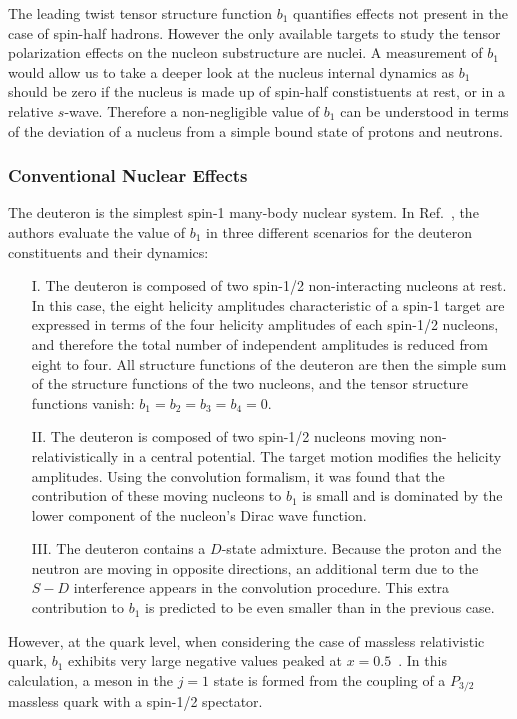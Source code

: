 The leading twist tensor structure function $b_1$ quantifies effects not present in 
the case of spin-half hadrons. However the only available targets to study the 
tensor polarization effects on the nucleon substructure are nuclei. 
A measurement of $b_1$ would allow us to take 
a deeper look at the nucleus internal dynamics as $b_1$ should be zero if the 
nucleus is made up of spin-half constistuents at rest, or in a relative $s$-wave. 
Therefore a non-negligible value of $b_1$ can be understood in terms of the deviation 
of a nucleus from a simple bound state of protons and neutrons.
%
\subsubsection{Conventional Nuclear Effects}
The deuteron is the simplest spin-1 many-body nuclear system. In Ref.~\cite{Hoodbhoy:1988am},
the authors evaluate the value of $b_1$ in three different scenarios for the deuteron
constituents and their dynamics:
\begin{enumerate}
 \item[I.] The deuteron is composed of two spin-1/2 non-interacting nucleons at rest. 
In this case, the eight helicity amplitudes characteristic of a spin-1 target are 
expressed in terms of the four helicity amplitudes of each spin-1/2 nucleons, and 
therefore the total number of independent amplitudes is reduced from eight to four. All structure 
functions of the deuteron are then the simple sum of the structure functions of the two 
nucleons, and the tensor structure functions vanish: $b_1 = b_2 
= b_3 = b_4 = 0$. 
 \item[II.] The deuteron is composed of two spin-1/2 nucleons moving non-relativistically 
in a central potential. The target motion modifies the helicity amplitudes. Using
the convolution formalism, it was found that the contribution of these moving nucleons
to $b_1$ is small and is dominated by the lower component of the nucleon's Dirac
wave function.
 \item[III.] The deuteron contains a $D$-state admixture. Because the proton and the neutron
are moving in opposite directions, an additional term due to the $S-D$ interference 
appears in the convolution procedure. This extra contribution to $b_1$ is predicted
to be even smaller than in the previous case.
\end{enumerate}

However, at the quark level, when considering the case of massless relativistic quark, 
$b_1$ exhibits very large negative values peaked at $x=0.5$~\cite{Hoodbhoy:1988am}.
In this calculation, a meson in the $j=1$ state is formed from the coupling of a $P_{3/2}$ 
massless quark with a spin-1/2 spectator.

